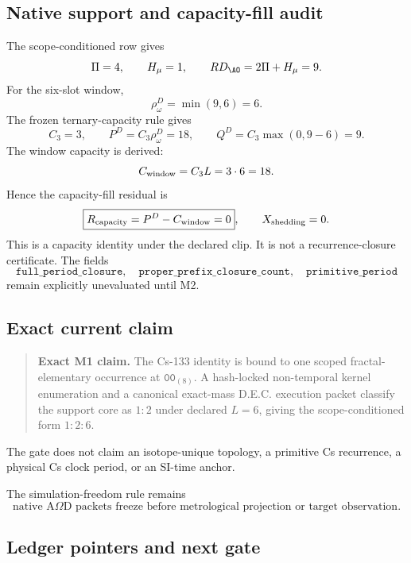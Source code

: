 \subsection{Native support and capacity-fill audit}

The scope-conditioned row gives
\[
\Pi=4,
\qquad
H_\mu=1,
\qquad
RD_{\AO}=2\Pi+H_\mu=9.
\]
For the six-slot window,
\[
\rho^D_\omega=\min(9,6)=6.
\]
The frozen ternary-capacity rule gives
\[
C_3=3,
\qquad
P^D=C_3\rho^D_\omega=18,
\qquad
Q^D=C_3\max(0,9-6)=9.
\]
The window capacity is derived:
\[
C_{\rm window}=C_3L=3\cdot6=18.
\]
Hence the capacity-fill residual is
\[
\boxed{R_{\rm capacity}=P^D-C_{\rm window}=0},
\qquad
X_{\rm shedding}=0.
\]
This is a capacity identity under the declared clip. It is not a recurrence-closure certificate. The fields
\[
\texttt{full\_period\_closure},\quad
\texttt{proper\_prefix\_closure\_count},\quad
\texttt{primitive\_period}
\]
remain explicitly unevaluated until M2.

\subsection{Exact current claim}

\begin{quote}
\textbf{Exact M1 claim.}
The Cs-133 identity is bound to one scoped fractal-elementary occurrence at
$\mathtt{00}_{(8)}$. A hash-locked non-temporal kernel enumeration and a
canonical exact-mass D.E.C. execution packet classify the support core as
$1{:}2$ under declared $L=6$, giving the scope-conditioned form $1{:}2{:}6$.
\end{quote}
The gate does not claim an isotope-unique topology, a primitive Cs recurrence, a physical Cs clock period, or an SI-time anchor.

The simulation-freedom rule remains
\[
\boxed{
\text{native A$\Omega$D packets freeze before metrological projection or target observation.}
}
\]

\subsection{Ledger pointers and next gate}


